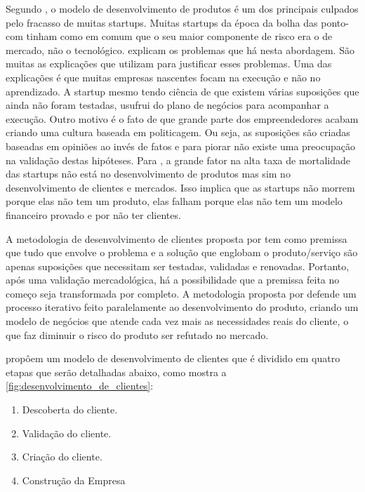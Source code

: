 Segundo , o modelo de desenvolvimento de produtos é um dos principais culpados pelo fracasso de muitas startups. Muitas startups da época da bolha das ponto-com tinham como  em comum que o seu maior componente de risco era o de mercado, não o tecnológico.  explicam os problemas que há nesta abordagem. São muitas as explicações que  utilizam para justificar esses problemas. Uma das explicações é que muitas empresas nascentes focam na execução e não no aprendizado. A startup mesmo tendo ciência de que existem várias suposições que ainda não foram testadas, usufrui do plano de negócios para acompanhar a execução. Outro motivo é o fato de que grande parte dos empreendedores acabam criando uma cultura baseada em politicagem. Ou seja, as suposições são criadas baseadas em opiniões ao invés de fatos e para piorar não existe uma preocupação na validação destas hipóteses. Para , a grande fator na alta taxa de mortalidade das startups não está no desenvolvimento de produtos mas sim no desenvolvimento de clientes e mercados. Isso implica que as startups não morrem porque elas não tem um produto, elas falham porque elas não tem um modelo financeiro provado e por não ter clientes.

A metodologia de desenvolvimento de clientes proposta por  tem como premissa que tudo que envolve o problema e a solução que englobam o produto/serviço são apenas suposições que necessitam ser testadas, validadas e renovadas. Portanto, após uma validação mercadológica, há a possibilidade que a premissa feita no começo seja transformada por completo. A metodologia proposta por  defende um processo iterativo feito paralelamente ao desenvolvimento do produto, criando um modelo de negócios que atende cada vez mais as necessidades reais do cliente, o que faz diminuir o risco do produto ser refutado no mercado.

 propôem um modelo de desenvolvimento de clientes que é dividido em quatro etapas que serão detalhadas abaixo, como mostra a \autoref{fig:desenvolvimento_de_clientes}:
\begin{enumerate}
\item Descoberta do cliente.
\item Validação do cliente.
\item Criação do cliente.
\item Construção da Empresa
\end{enumerate}

